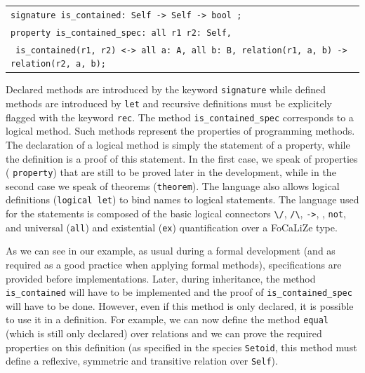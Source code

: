 \documentclass[submission,copyright,creativecommons]{eptcs}
\def\focalize{FoCaLiZe \mbox{}}
\begin{document}
\begin{center}
\begin{scriptsize}
\begin{tabular}{|l|}
\hline
{\tt signature is\_contained: Self -> Self -> bool ;}\\
{\tt property is\_contained\_spec: all r1 r2: Self,}\\ 
{\tt  \hspace{0.2cm} is\_contained(r1, r2) <->  all a: A, all b: B, relation(r1, a, b) -> relation(r2, a, b);}\\
\hline
\end{tabular}
\end{scriptsize}
\end{center}

\noindent
Declared methods are introduced by the keyword
{\footnotesize \tt signature} while defined methods are introduced by {\footnotesize \tt let} and recursive
definitions must be explicitely flagged with the keyword {\footnotesize \tt rec}.
The method {\footnotesize \tt is\_contained\_spec} corresponds to a
logical method. 
Such methods represent the properties of
programming methods. The declaration of a logical method 
is simply the statement of a property, while the definition is a proof of
this statement. In the first case, we speak of {properties} ({\footnotesize
  \tt property}) that are still
to be proved later in the development, while in the second case we speak of
{theorems} ({\footnotesize \tt theorem}). 
The language also allows logical definitions ({\footnotesize \tt logical
  let}) to bind names to logical statements.
The language used for the statements is composed of the basic logical
connectors {\footnotesize \verb+\/+}, {\footnotesize \verb+/\+}, 
{\footnotesize \tt ->}, {\footnotesize \tt <->}, {\footnotesize \tt not}, 
and universal ({\footnotesize \tt all})
and existential ({\footnotesize \tt ex}) quantification over a \focalize type.

As we can see in our example,
as usual during a formal development (and as required as a good
practice when applying formal methods), specifications are provided
before implementations. Later, during inheritance,
the method 
{\footnotesize \tt is\_contained} will have to be implemented and the proof of 
{\footnotesize \tt is\_contained\_spec} will have to be done.
However, even if this method is only declared, it is possible to use it in a
definition. For example, we can now define the method 
{\footnotesize \tt equal} (which is still only declared) over
relations and we can prove the required properties on this definition 
(as specified in the species {\footnotesize \tt Setoid}, this method must define a reflexive, symmetric and transitive
relation over {\footnotesize \tt Self}).
\end{document}
